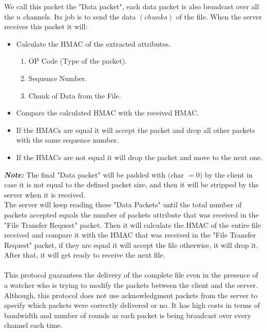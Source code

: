 \documentclass[main.tex]{subfiles}
\begin{document}
We call this packet the "Data packet", each data packet is also broadcast over all the $n$ channels. Its job is to send the data $(chunks)$ of the file. When the server receives this packet it will: 
\begin{itemize}
\item Calculate the HMAC of the extracted attributes.\begin{enumerate}
\item OP Code (Type of the packet).
\item Sequence Number.
\item Chunk of Data from the File.
\end{enumerate}
\item Compare the calculated HMAC with the received HMAC.
\item If the HMACs are equal it will accept the packet and drop all other packets with the same sequence number.
\item If the HMACs are not equal it will drop the packet and move to the next one.
\end{itemize}
\textbf{\textit{Note:}} The final "Data packet" will be padded with $($char $= 0)$ by the client in case it is not equal to the defined packet size, and then it will be stripped by the server when it is received.\\
The server will keep reading these "Data Packets" until the total number of packets accepted equals the number of packets attribute that was received in the "File Transfer Request" packet. Then it will calculate the HMAC of the entire file received and compare it with the HMAC that was received in the "File Transfer Request" packet, if they are equal it will accept the file otherwise, it will drop it. After that, it will get ready to receive the next file.\paragraph{}
This protocol guarantees the delivery of the complete file even in the presence of a watcher who is trying to modify the packets between the client and the server. Although, this protocol does not use acknowledgment packets from the server to specify which packets were correctly delivered or no. It has high costs in terms of bandwidth and number of rounds as each packet is being broadcast over every channel each time.
\end{document}
